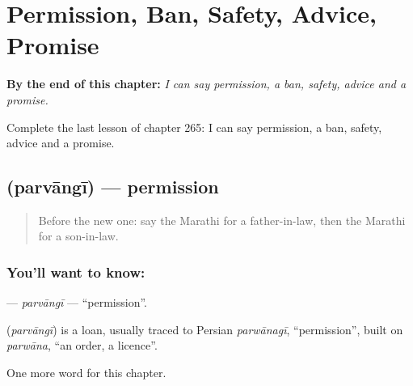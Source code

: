 
\chapter{Permission, Ban, Safety, Advice, Promise}
\label{ch:mr-permission-ban-safety-advice-promise}

\begin{chapteropening}
\textbf{By the end of this chapter:} \emph{I can say permission, a ban, safety, advice and a promise.}

Complete the last lesson of chapter 265: I can say permission, a ban, safety, advice and a promise.
\end{chapteropening}

\section[\texorpdfstring{\mr{परवानगी} (parvāngī)}{परवानगी (parvāngī)}]{ (parvāngī) — permission}

\label{lesson:MR-C265-parvangi}



\begin{quote}
Before the new one: say the Marathi for a father-in-law, then the Marathi for a son-in-law.
\end{quote}

\subsection*{You'll want to know: }
\textbf{} — \emph{parvāngī} — \textquotedblleft{}permission\textquotedblright{}.

\begin{cousinweb}
\textbf{} (\emph{parvāngī}) is a loan, usually traced to Persian \emph{parwānagī}, \textquotedblleft{}permission\textquotedblright{}, built on \emph{parwāna}, \textquotedblleft{}an order, a licence\textquotedblright{}.
\end{cousinweb}

\begin{grammarlens}[title={What you've built}]
One more word for this chapter.
\end{grammarlens}

